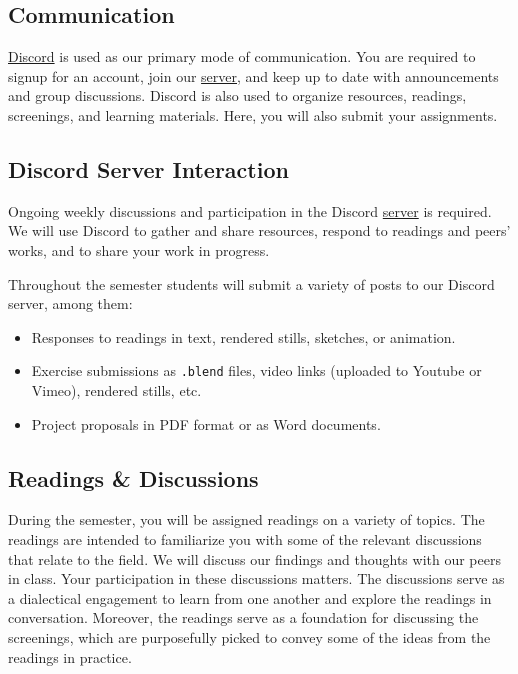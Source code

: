 \hypertarget{communication}{%
      \subsection{Communication}}

\href{http://discordapp.com/}{Discord} is used as our primary mode of communication. You are required to signup for an account, join our \href{\discordURL}{server}, and keep up to date with announcements and group discussions. Discord is also used to organize resources, readings, screenings, and learning materials. Here, you will also submit your assignments.

\subsection{Discord Server Interaction}
Ongoing weekly discussions and participation in the Discord \href{\discordURL}{server} is required. We will use Discord to gather and share resources, respond to readings and peers' works, and to share your work in progress.

Throughout the semester students will submit a variety of posts to our Discord server, among them:
\begin{itemize}
      \tightlist
      \item Responses to readings in text, rendered stills, sketches, or animation.
      \item Exercise submissions as \texttt{.blend} files, video links (uploaded to Youtube or Vimeo), rendered stills, etc.
      \item Project proposals in PDF format or as Word documents.
\end{itemize}

\subsection{Readings \& Discussions}

During the semester, you will be assigned readings on a variety of topics. The readings are intended to familiarize you with some of the relevant discussions that relate to the field. We will discuss our findings and thoughts with our peers in class. Your participation in these discussions matters. The discussions serve as a dialectical engagement to learn from one another and explore the readings in conversation. Moreover, the readings serve as a foundation for discussing the screenings, which are purposefully picked to convey some of the ideas from the readings in practice.

